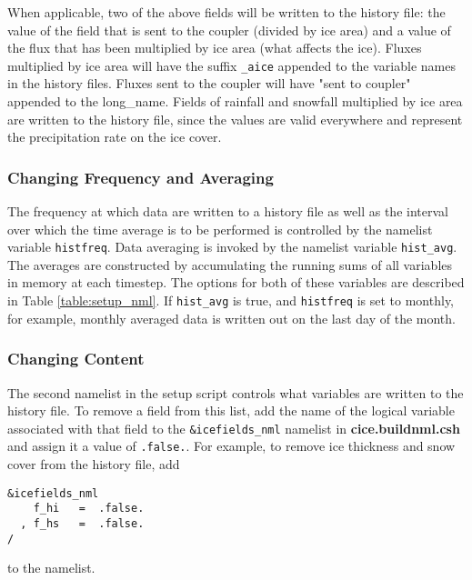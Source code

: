 When applicable, two of the above fields will be written to the
history file:  the value of the field that is sent to the coupler
(divided by ice area) and a value of the flux that has been multiplied by
ice area (what affects the ice). Fluxes multiplied by ice area will have
the suffix {\tt \_aice} appended to the variable names in the history files.
Fluxes sent to the coupler will have "sent to coupler" appended to the
long\_name.  Fields of rainfall and snowfall multiplied by ice area are
written to the history file, since the values are valid everywhere and
represent the precipitation rate on the ice cover.




\subsubsection{Changing Frequency and Averaging} 

The frequency at which data are written to a history file as well as the
interval over which the time average is to be performed is controlled
by the namelist variable {\tt histfreq}.  Data averaging is invoked
by the namelist variable {\tt hist\_avg}.  The averages are constructed
by accumulating the running sums of all variables in memory at each timestep.
The options for both of these variables are described in Table 
\ref{table:setup_nml}.  If {\tt hist\_avg} is true, and {\tt histfreq}
is set to monthly, for example, monthly averaged data is written out on
the last day of the month.

\subsubsection{Changing Content} 
\label{change_content}

The second namelist in the setup script controls what variables are written
to the history file. To remove a field from this list, add the name of the
logical variable associated with that field to the {\tt \&icefields\_nml}
namelist in {\bf cice.buildnml.csh}
and assign it a value of {\tt .false.}.  For example, to remove
ice thickness and snow cover from the history file, add

\begin{verbatim}
&icefields_nml
    f_hi   =  .false.
  , f_hs   =  .false.
/
\end{verbatim}
to the namelist.  

